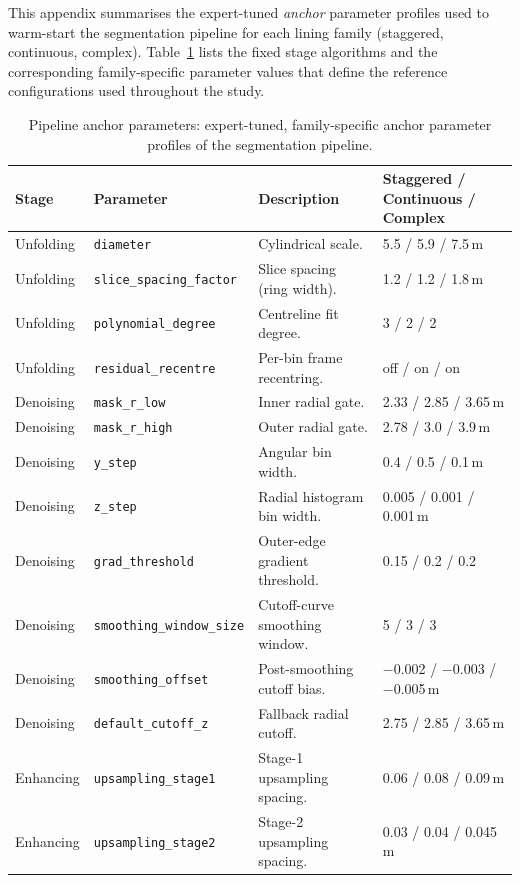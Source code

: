 \documentclass[a4paper,fleqn]{cas-dc}
\begin{document}
{This appendix summarises the expert-tuned \emph{anchor} parameter profiles used to warm-start the segmentation pipeline for each lining family (staggered, continuous, complex). Table~\ref{tab:anchor-params} lists the fixed stage algorithms and the corresponding family-specific parameter values that define the reference configurations used throughout the study.

\begin{table}[t]
\caption{Pipeline anchor parameters: expert-tuned, family-specific anchor parameter profiles of the segmentation pipeline.}\label{tab:anchor-params}
\begin{tabular*}{\textwidth}{@{\extracolsep{\fill}} l l p{} l @{}}
\toprule
Stage & Parameter & Description & Staggered / Continuous / Complex \\
\midrule
Unfolding & \texttt{diameter} & Cylindrical scale. & 5.5 / 5.9 / 7.5\,m \\
Unfolding & \texttt{slice\_spacing\_factor} & Slice spacing (ring width). & 1.2 / 1.2 / 1.8\,m \\
Unfolding & \texttt{polynomial\_degree} & Centreline fit degree. & 3 / 2 / 2 \\
Unfolding & \texttt{residual\_recentre} & Per-bin frame recentring. & off / on / on \\
\midrule
Denoising & \texttt{mask\_r\_low} & Inner radial gate. & 2.33 / 2.85 / 3.65\,m \\
Denoising & \texttt{mask\_r\_high} & Outer radial gate. & 2.78 / 3.0 / 3.9\,m \\
Denoising & \texttt{y\_step} & Angular bin width. & 0.4 / 0.5 / 0.1\,m \\
Denoising & \texttt{z\_step} & Radial histogram bin width. & 0.005 / 0.001 / 0.001\,m \\
Denoising & \texttt{grad\_threshold} & Outer-edge gradient threshold. & 0.15 / 0.2 / 0.2 \\
Denoising & \texttt{smoothing\_window\_size} & Cutoff-curve smoothing window. & 5 / 3 / 3 \\
Denoising & \texttt{smoothing\_offset} & Post-smoothing cutoff bias. & $-$0.002 / $-$0.003 / $-$0.005\,m \\
Denoising & \texttt{default\_cutoff\_z} & Fallback radial cutoff. & 2.75 / 2.85 / 3.65\,m \\
\midrule
Enhancing & \texttt{upsampling\_stage1} & Stage-1 upsampling spacing. & 0.06 / 0.08 / 0.09\,m \\
Enhancing & \texttt{upsampling\_stage2} & Stage-2 upsampling spacing. & 0.03 / 0.04 / 0.045\,m \\

\end{tabular*}
\end{table}}
\end{document}
